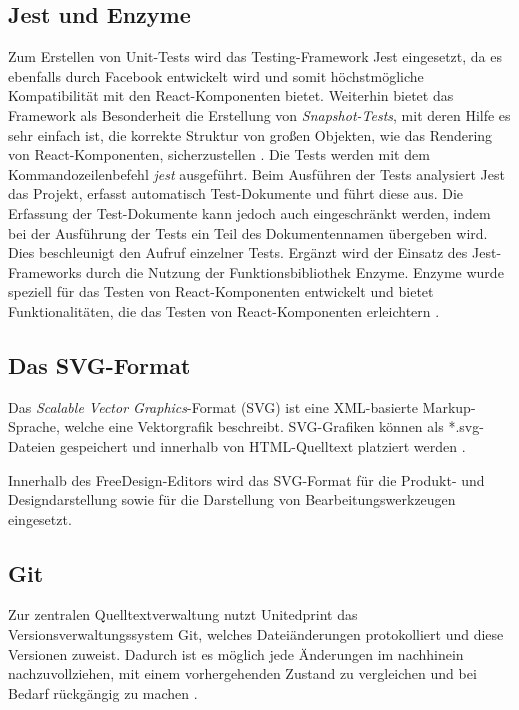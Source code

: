 \subsection{Jest und Enzyme}
Zum Erstellen von Unit-Tests wird das Testing-Framework Jest eingesetzt, da es ebenfalls durch Facebook entwickelt wird und somit höchstmögliche Kompatibilität mit den React-Komponenten bietet. Weiterhin bietet das Framework als Besonderheit die Erstellung von \emph{Snapshot-Tests}, mit deren Hilfe es sehr einfach ist, die korrekte Struktur von großen Objekten, wie das Rendering von React-Komponenten, sicherzustellen \autocite[vgl.][]{Facebook:JestIntroduction}.
Die Tests werden mit dem Kommandozeilenbefehl \emph{jest} ausgeführt.
Beim Ausführen der Tests analysiert Jest das Projekt,  erfasst automatisch Test-Dokumente und führt diese aus. 
Die Erfassung der Test-Dokumente kann jedoch auch eingeschränkt werden, indem bei der Ausführung der Tests ein Teil des Dokumentennamen übergeben wird. Dies beschleunigt den Aufruf einzelner Tests. 
Ergänzt wird der Einsatz des Jest-Frameworks durch die Nutzung der Funktionsbibliothek Enzyme. Enzyme wurde speziell für das Testen von React-Komponenten entwickelt und bietet Funktionalitäten, die das Testen von React-Komponenten erleichtern \autocite[vgl.][]{Enzyme:Introduction}.

\subsection{Das SVG-Format}
Das \emph{Scalable Vector Graphics}-Format (SVG) ist eine XML-basierte Markup-Sprache, welche eine Vektorgrafik beschreibt. SVG-Grafiken können als *.svg-Dateien gespeichert und innerhalb von HTML-Quelltext platziert werden \autocite[vgl.][]{W3C:AboutSVG}. 

Innerhalb des FreeDesign-Editors wird das SVG-Format für die Produkt- und Designdarstellung sowie für die Darstellung von Bearbeitungswerkzeugen eingesetzt. 

\subsection{Git}
\label{chap:git}
Zur zentralen Quelltextverwaltung nutzt Unitedprint das Versionsverwaltungssystem Git, welches Dateiänderungen protokolliert und diese Versionen zuweist. Dadurch ist es möglich jede Änderungen im nachhinein nachzuvollziehen, mit einem vorhergehenden Zustand zu vergleichen und bei Bedarf rückgängig zu machen \autocite[vgl.][]{Git:About}.

